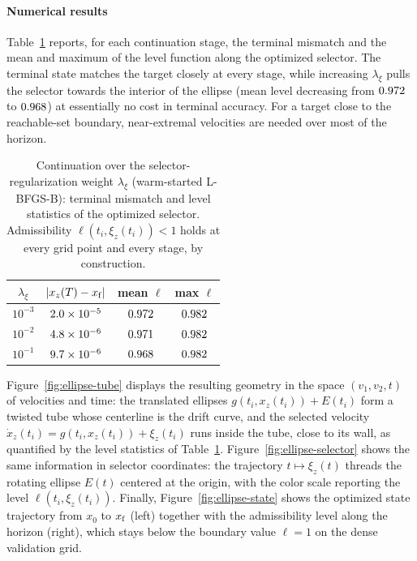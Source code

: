 \documentclass[11pt]{elsarticle}
\theoremstyle{definition}
\theoremstyle{remark}
\numberwithin{equation}{section}
\begin{document}
\paragraph{Numerical results}
Table~\ref{tab:ellipse-continuation} reports, for each continuation
stage, the terminal mismatch and the mean and maximum of the level
function along the optimized selector. The terminal state matches the
target closely at every stage, while increasing
$\lambda_{\xi}$ pulls the selector towards the interior of
the ellipse (mean level decreasing from $0.972$ to $0.968$) at
essentially no cost in terminal accuracy. For a target close to the
reachable-set boundary, near-extremal velocities are needed over most of
the horizon.

\begin{table}[htbp]
	\centering
	\begin{tabular}{cccc}
		\toprule
		$\lambda_{\xi}$ & $|x_z(T)-x_{\rm f}|$ & mean $\ell$ & max $\ell$ \\
		\midrule
		$10^{-3}$ & $2.0\times 10^{-5}$ & $0.972$ & $0.982$ \\
		$10^{-2}$ & $4.8\times 10^{-6}$ & $0.971$ & $0.982$ \\
		$10^{-1}$ & $9.7\times 10^{-6}$ & $0.968$ & $0.982$ \\
		\bottomrule
	\end{tabular}
	\caption{Continuation over the selector-regularization weight
		$\lambda_{\xi}$ (warm-started L-BFGS-B): terminal mismatch and level
		statistics of the optimized selector. Admissibility
		$\ell(t_i,\xi_z(t_i))<1$ holds at every grid point and every stage, by
		construction.}
	\label{tab:ellipse-continuation}
\end{table}

Figure~\ref{fig:ellipse-tube} displays the resulting geometry in the
space $(v_1,v_2,t)$ of velocities and time: the translated ellipses
$g(t_i,x_z(t_i))+E(t_i)$ form a twisted tube whose centerline is the
drift curve, and the selected velocity
$\dot{x}_z(t_i)=g(t_i,x_z(t_i))+\xi_z(t_i)$ runs inside the tube, close
to its wall, as quantified by the level statistics of
Table~\ref{tab:ellipse-continuation}. Figure~\ref{fig:ellipse-selector}
shows the same information in selector coordinates: the trajectory
$t\mapsto\xi_z(t)$ threads the rotating ellipse $E(t)$ centered at the
origin, with the color scale reporting the level
$\ell(t_i,\xi_z(t_i))$. Finally, Figure~\ref{fig:ellipse-state} shows
the optimized state trajectory from $x_0$ to $x_{\rm f}$ (left) together
with the admissibility level along the horizon (right), which stays
below the boundary value $\ell=1$ on the dense validation grid.
\end{document}
